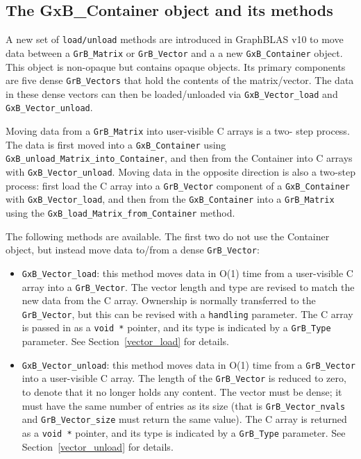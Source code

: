 \newpage
\subsection{The GxB\_Container object and its methods}
\label{container}

A new set of \verb'load/unload' methods are introduced in GraphBLAS v10 to move
data between a \verb'GrB_Matrix' or \verb'GrB_Vector' and a a new
\verb'GxB_Container' object.  This object is non-opaque but contains opaque
objects.  Its primary components are five dense \verb'GrB_Vectors' that hold
the contents of the matrix/vector.  The data in these dense vectors can then be
loaded/unloaded via \verb'GxB_Vector_load' and \verb'GxB_Vector_unload'.

Moving data from a \verb'GrB_Matrix' into user-visible C arrays is a two-
step process.  The data is first moved into a \verb'GxB_Container' using \newline
\verb'GxB_unload_Matrix_into_Container', and then from the Container
into C arrays with \verb'GxB_Vector_unload'.  Moving data in the opposite
direction is also a two-step process: first load the C array into a
\verb'GrB_Vector' component of a \verb'GxB_Container' with \verb'GxB_Vector_load',
and then from the \verb'GxB_Container' into a \verb'GrB_Matrix' using
the \verb'GxB_load_Matrix_from_Container' method.

The following methods are available.  The first two do not use the
Container object, but instead move data to/from a dense \verb'GrB_Vector':

\begin{itemize}

\item \verb'GxB_Vector_load':  this method moves data in O(1) time from a user-visible
    C array into a \verb'GrB_Vector'.  The vector length and type are revised
    to match the new data from the C array.  Ownership is normally transferred
    to the \verb'GrB_Vector', but this can be revised with a \verb'handling'
    parameter.  The C array is passed in as a \verb'void *' pointer, and its
    type is indicated by a \verb'GrB_Type' parameter.
    See Section~\ref{vector_load} for details.

\item \verb'GxB_Vector_unload': this method moves data in O(1) time from a
    \verb'GrB_Vector' into a user-visible C array.  The length of the
    \verb'GrB_Vector' is reduced to zero, to denote that it no longer holds any
    content.  The vector must be dense; it must have the same number of entries
    as its size (that is \verb'GrB_Vector_nvals' and \verb'GrB_Vector_size'
    must return the same value).  The C array is returned as a \verb'void *'
    pointer, and its type is indicated by a \verb'GrB_Type' parameter.  See
    Section~\ref{vector_unload} for details.

\end{itemize}

